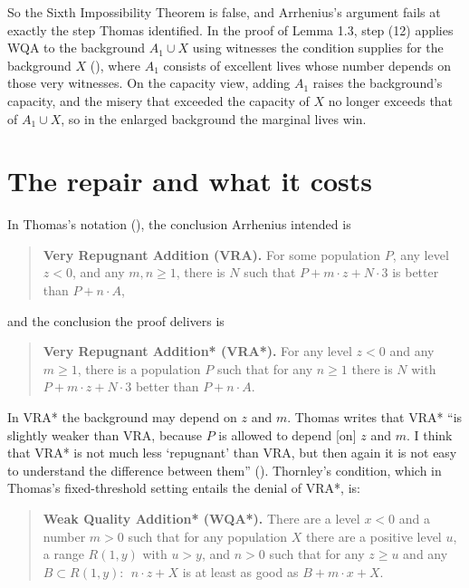 \documentclass[
  11pt,
  letterpaper,
  DIV=11,
  numbers=noendperiod,
  twoside]{scrartcl}
\begin{document}
So the Sixth Impossibility Theorem is false, and Arrhenius's argument
fails at exactly the step Thomas identified. In the proof of Lemma 1.3,
step (12) applies WQA to the background \(A_1 \cup X\) using witnesses
the condition supplies for the background \(X\)
(), where \(A_1\)
consists of excellent lives whose number depends on those very
witnesses. On the capacity view, adding \(A_1\) raises the background's
capacity, and the misery that exceeded the capacity of \(X\) no longer
exceeds that of \(A_1 \cup X\), so in the enlarged background the
marginal lives win.

\section{The repair and what it costs}\label{sec-repair}

In Thomas's notation (), the
conclusion Arrhenius intended is

\begin{quote}
\textbf{Very Repugnant Addition (VRA).} For some population \(P\), any
level \(z < 0\), and any \(m, n \geq 1\), there is \(N\) such that
\(P + m \cdot z + N \cdot 3\) is better than \(P + n \cdot A\),
\end{quote}

and the conclusion the proof delivers is

\begin{quote}
\textbf{Very Repugnant Addition* (VRA*).} For any level \(z < 0\) and
any \(m \geq 1\), there is a population \(P\) such that for any
\(n \geq 1\) there is \(N\) with \(P + m \cdot z + N \cdot 3\) better
than \(P + n \cdot A\).
\end{quote}

In VRA* the background may depend on \(z\) and \(m\). Thomas writes that
VRA* ``is slightly weaker than VRA, because \(P\) is allowed to depend
{[}on{]} \(z\) and \(m\). I think that VRA* is not much less `repugnant'
than VRA, but then again it is not easy to understand the difference
between them'' (). Thornley's
condition, which in Thomas's fixed-threshold setting entails the denial
of VRA*, is:

\begin{quote}
\textbf{Weak Quality Addition* (WQA*).} There are a level \(x < 0\) and
a number \(m > 0\) such that for any population \(X\) there are a
positive level \(u\), a range \(R(1,y)\) with \(u > y\), and \(n > 0\)
such that for any \(z \geq u\) and any \(B \subset R(1,y)\):
\(\;n \cdot z + X\) is at least as good as \(B + m \cdot x + X\).
\end{quote}
\end{document}
